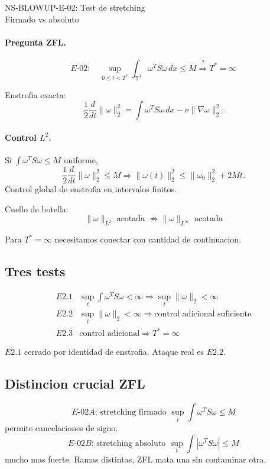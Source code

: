 \documentclass[11pt]{article}
\begin{document}
\begin{center}
{\Large NS-BLOWUP-E-02: Test de stretching}\\
Firmado vs absoluto
\end{center}

\paragraph{Pregunta ZFL.}
\[
\boxed{E\text{-}02:\quad \sup_{0\le t<T^*}\int_{\mathbb T^3}\omega^T S\omega\,dx\le M\stackrel{?}{\Rightarrow}T^*=\infty}
\]

Enstrofia exacta:
\[
\frac12\frac d{dt}\|\omega\|_2^2=\int\omega^T S\omega\,dx-\nu\|\nabla\omega\|_2^2.
\]

\paragraph{Control $L^2$.} Si $\int\omega^T S\omega\le M$ uniforme,
\[
\frac12\frac d{dt}\|\omega\|_2^2\le M\Rightarrow \|\omega(t)\|_2^2\le\|\omega_0\|_2^2+2Mt.
\]
Control global de enstrofia en intervalos finitos.

Cuello de botella:
\[
\boxed{\|\omega\|_{L^2}\text{ acotada }\not\Rightarrow\|\omega\|_{L^\infty}\text{ acotada}}
\]

Para $T^*=\infty$ necesitamos conectar con cantidad de continuacion.

\subsection*{Tres tests}
\[
\boxed{
\begin{array}{ll}
E2.1& \sup_t\int\omega^T S\omega<\infty\Rightarrow\sup_t\|\omega\|_2<\infty\\
E2.2& \sup_t\|\omega\|_2<\infty\Rightarrow\text{control adicional suficiente}\\
E2.3& \text{control adicional}\Rightarrow T^*=\infty
\end{array}}
\]

$E2.1$ cerrado por identidad de enstrofia. Ataque real es $E2.2$.

\subsection*{Distincion crucial ZFL}
\[
\boxed{E\text{-}02A\text{: stretching firmado } \sup_t\int\omega^T S\omega\le M}
\]
permite cancelaciones de signo.
\[
\boxed{E\text{-}02B\text{: stretching absoluto } \sup_t\int|\omega^T S\omega|\le M}
\]
mucho mas fuerte. Ramas distintas, ZFL mata una sin contaminar otra.
\end{document}
